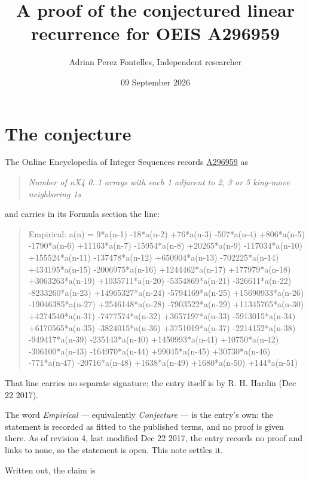 \documentclass[11pt]{article}
\title{A proof of the conjectured linear recurrence for OEIS A296959}
\author{Adrian Perez Fontelles, Independent researcher}
\date{09 September 2026}
\theoremstyle{definition}
\begin{document}
\maketitle
\section{The conjecture}

The Online Encyclopedia of Integer Sequences records \href{https://oeis.org/A296959}{A296959} as

\begin{quote}\itshape Number of nX4 0..1 arrays with each 1 adjacent to 2, 3 or 5 king-move neighboring 1s\end{quote}

and carries in its Formula section the line:

\begin{quote}\ttfamily Empirical: a(n) = 9*a(n-1) -18*a(n-2) +76*a(n-3) -507*a(n-4) +806*a(n-5) -1790*a(n-6) +11163*a(n-7) -15954*a(n-8) +20265*a(n-9) -117034*a(n-10) +155524*a(n-11) -137478*a(n-12) +650904*a(n-13) -702225*a(n-14) +434195*a(n-15) -2006975*a(n-16) +1244462*a(n-17) +177979*a(n-18) +3063263*a(n-19) +1035711*a(n-20) -5354869*a(n-21) -326611*a(n-22) -8233260*a(n-23) +14965327*a(n-24) -5794169*a(n-25) +15690933*a(n-26) -19046385*a(n-27) +2546148*a(n-28) -7903522*a(n-29) +11345765*a(n-30) +4274540*a(n-31) -7477574*a(n-32) +3657197*a(n-33) -5913015*a(n-34) +6170565*a(n-35) -3824015*a(n-36) +3751019*a(n-37) -2214152*a(n-38) -949417*a(n-39) -235143*a(n-40) +1450993*a(n-41) +10750*a(n-42) -306100*a(n-43) -164970*a(n-44) +99045*a(n-45) +30730*a(n-46) -771*a(n-47) -20716*a(n-48) +1638*a(n-49) +1680*a(n-50) +144*a(n-51)\end{quote}

That line carries no separate signature; the entry itself is by R. H. Hardin (Dec 22 2017).

The word {\itshape Empirical} --- equivalently {\itshape Conjecture} --- is the entry's own: the statement is recorded as fitted to the published terms, and no proof is given there. As of revision 4, last modified Dec 22 2017, the entry records no proof and links to none, so the statement is open. This note settles it.

Written out, the claim is
\end{document}
